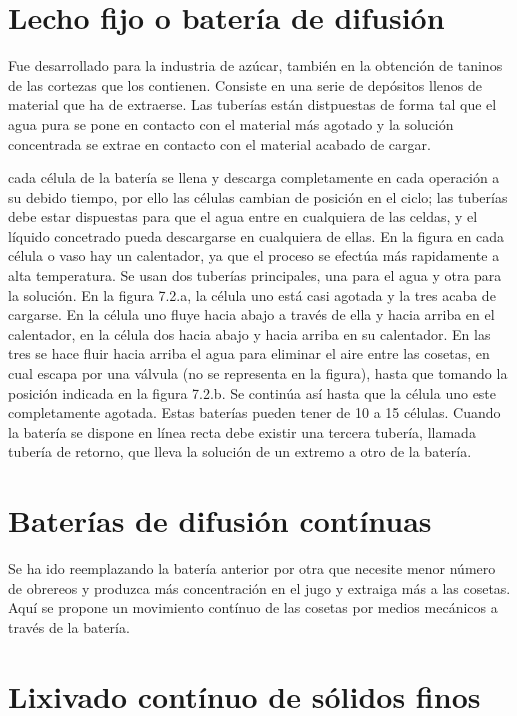 \documentclass[12pt,openany]{book}
\begin{document}
\section{Lecho fijo o batería de difusión}

Fue desarrollado para la industria de azúcar, también en la obtención 
de taninos de las cortezas que los contienen.
Consiste en una serie de depósitos llenos de material que ha de extraerse. Las 
tuberías están distpuestas de forma tal que el agua pura se pone en contacto con 
el material más agotado y la solución concentrada se extrae en contacto con el material acabado de cargar.

cada célula de la batería se llena y descarga completamente en cada operación 
a su debido tiempo, por ello las células cambian de posición en el ciclo; las tuberías debe estar 
dispuestas para que el agua entre en cualquiera de las celdas, y el líquido concetrado pueda 
descargarse en cualquiera de ellas.
En la figura en cada célula o vaso hay un calentador, ya que el proceso se 
efectúa más rapidamente a alta temperatura. Se usan dos tuberías principales, una 
para el agua y otra para la solución. En la figura 7.2.a, la célula uno está casi 
agotada y la tres acaba de cargarse. En la célula uno fluye hacia abajo a través de 
ella y hacia arriba en el calentador, en la célula dos hacia abajo y hacia arriba en su 
calentador. En las tres se hace fluir hacia arriba el agua para eliminar el aire entre las cosetas, en 
cual escapa por una válvula (no se representa en la figura), hasta que tomando la posición indicada 
en la figura 7.2.b. Se continúa así hasta que la célula uno este completamente agotada.
Estas baterías pueden tener de 10 a 15 células. Cuando la batería se dispone 
en línea recta debe existir una tercera tubería, llamada tubería de retorno, que lleva la 
solución de un extremo a otro de la batería.

\section{Baterías de difusión contínuas}

Se ha ido reemplazando la batería anterior por otra que necesite menor 
número de obrereos y produzca más concentración en el jugo y extraiga más a las 
cosetas. Aquí se propone un movimiento contínuo de las cosetas por medios mecánicos a través de la batería. 

\section{Lixivado contínuo de sólidos finos}
\end{document}
